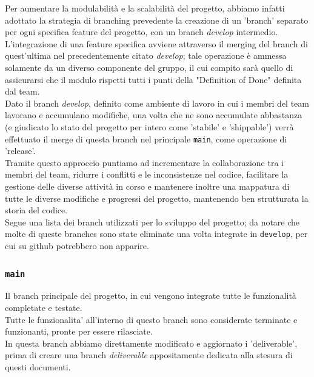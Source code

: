 \documentclass{article}
\begin{document}
\noindent
Per aumentare la modulabilità e la scalabilità del progetto, abbiamo infatti adottato la strategia di branching prevedente la creazione di un 'branch' separato per ogni specifica feature del progetto, con un branch \textit{develop} intermedio.\\

\noindent
L'integrazione di una feature specifica avviene attraverso il merging del branch di quest'ultima nel precedentemente citato \textit{develop}; tale operazione è ammessa solamente da un diverso componente del gruppo, il cui compito sarà quello di assicurarsi che il modulo rispetti tutti i punti della "Definition of Done" definita dal team. \\

\noindent
Dato il branch \textit{develop}, definito come ambiente di lavoro in cui i membri del team lavorano e accumulano modifiche, una volta che ne sono accumulate abbastanza (e giudicato lo stato del progetto per intero come 'stabile' e 'shippable') verrà effettuato il merge di questa branch nel principale \texttt{main}, come operazione di 'release'. \\

\noindent
Tramite questo approccio puntiamo ad incrementare la collaborazione tra i membri del team, ridurre i conflitti e le inconsistenze nel codice, facilitare la gestione delle diverse attività in corso e mantenere inoltre una mappatura di tutte le diverse modifiche e progressi del progetto, mantenendo ben strutturata la storia del codice.\\

Segue una lista dei branch utilizzati per lo sviluppo del progetto; da notare che molte di queste branches sono state eliminate una volta integrate in \texttt{develop}, per cui su github potrebbero non apparire.

\subsubsection{\texttt{main}}
Il branch principale del progetto, in cui vengono integrate tutte le funzionalità completate e testate.\\
Tutte le funzionalita' all'interno di questo branch sono considerate terminate e funzionanti, pronte per essere rilasciate.\\
In questa branch abbiamo direttamente modificato e aggiornato i 'deliverable', prima di creare una branch \textit{deliverable} appositamente dedicata alla stesura di questi documenti.
\end{document}
